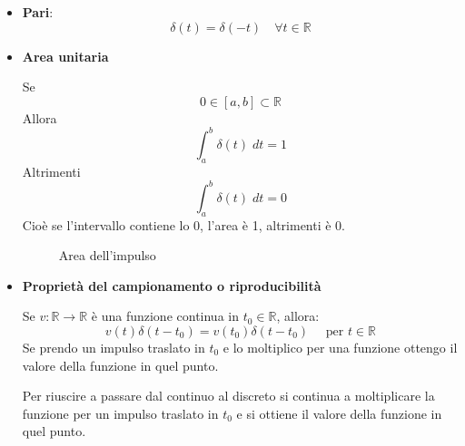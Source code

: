 \documentclass[a4paper]{article}
\begin{document}
\begin{itemize}
  \item \textbf{Pari}:
    \[
    \delta(t) = \delta(-t) \quad \forall t \in \mathbb{R}
    \] 

  \item \textbf{Area unitaria}

    \noindent
    Se
    \[
       0 \in [a,b] \subset \mathbb{R}
    \] 
    Allora
    \[
    \int_a^b \delta(t) \; dt = 1
    \] 
    Altrimenti
    \[
    \int_a^b \delta(t) \; dt = 0
  \]
  Cioè se l'intervallo contiene lo 0, l'area è 1, altrimenti è 0.
  \begin{figure}[H]
    \centering
    \caption{Area dell'impulso}
  \end{figure}

  \item \textbf{Proprietà del campionamento o riproducibilità}

    \noindent Se \( v: \mathbb{R}\to \mathbb{R} \) è una funzione continua in
    \( t_0 \in \mathbb{R} \), allora:
    \[
    v(t) \delta(t-t_0) = v(t_0) \delta(t-t_0) \quad \text{ per } t \in \mathbb{R}
    \] 
    Se prendo un impulso traslato in \( t_0 \)  e lo moltiplico per una funzione
    ottengo il valore della funzione in quel punto.
    \begin{figure}[H]
      \centering
    \end{figure}
    \noindent
    Per riuscire a passare dal continuo al discreto si continua a moltiplicare
    la funzione per un impulso traslato in \( t_0 \) e si ottiene il valore
    della funzione in quel punto.


\end{itemize}
\end{document}
